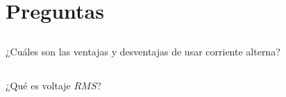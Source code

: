 \documentclass[../main.tex]{subfiles}
\begin{document}
\section{Preguntas}%

\thispagestyle{fancy}

\subsection{}%

¿Cuáles son las ventajas y desventajas de usar corriente alterna?

\subsection{}%

¿Qué es voltaje $RMS$?
\end{document}
